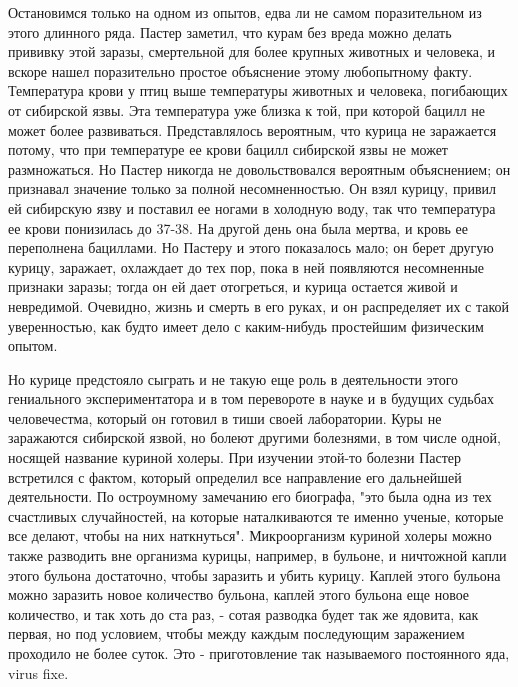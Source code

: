 Остановимся только на одном из опытов, едва ли не самом поразительном из
этого длинного ряда. Пастер  заметил, что курам  без вреда можно  делать
прививку этой заразы, смертельной для более крупных животных и человека,
и вскоре нашел поразительно простое объяснение этому любопытному  факту.
Температура  крови  у  птиц   выше  температуры  животных  и   человека,
погибающих от  сибирской язвы.  Эта температура  уже близка  к той,  при
которой бацилл не может более развиваться. Представлялось вероятным, что
курица не  заражается  потому,  что  при  температуре  ее  крови  бацилл
сибирской  язвы   не   может   размножаться.  Но   Пастер   никогда   не
довольствовался вероятным объяснением; он  признавал значение только  за
полной несомненностью.  Он  взял  курицу, привил  ей  сибирскую  язву  и
поставил ее  ногами  в  холодную  воду, так  что  температура  ее  крови
понизилась до  37-38.  На другой  день  она  была мертва,  и  кровь  ее
переполнена бациллами.  Но Пастеру  и этого  показалось мало;  он  берет
другую курицу, заражает,  охлаждает до  тех пор, пока  в ней  появляются
несомненные признаки  заразы;  тогда он  ей  дает отогреться,  и  курица
остается живой и невредимой. Очевидно, жизнь и смерть в его руках, и  он
распределяет  их  с   такой  уверенностью,  как   будто  имеет  дело   с
каким-нибудь простейшим физическим опытом.

Но курице предстояло сыграть  и не такую еще  роль в деятельности  этого
гениального экспериментатора  и в  том перевороте  в науке  и в  будущих
судьбах человечестма, который он готовил в тиши своей лаборатории.  Куры
не заражаются сибирской язвой, но болеют другими болезнями, в том  числе
одной, носящей  название куриной  холеры. При  изучении этой-то  болезни
Пастер встретился  с  фактом,  который  определил  все  направление  его
дальнейшей деятельности.  По остроумному  замечанию его  биографа,  "это
была одна из  тех счастливых случайностей,  на которые наталкиваются  те
именно  ученые,   которые  все   делают,  чтобы   на  них   наткнуться".
Микроорганизм куриной холеры можно также разводить вне организма курицы,
например, в бульоне, и ничтожной  капли этого бульона достаточно,  чтобы
заразить и  убить  курицу. Каплей  этого  бульона можно  заразить  новое
количество бульона, каплей  этого бульона  еще новое  количество, и  так
хоть до ста раз, - сотая разводка  будет так же ядовита, как первая,  но
под условием,  чтобы между  каждым последующим  заражением проходило  не
более суток. Это - приготовление так называемого постоянного яда,  virus
fixe.

